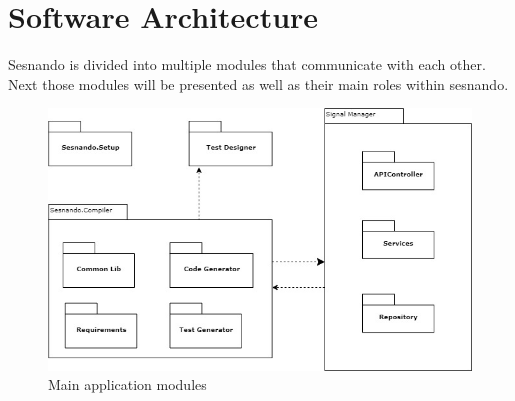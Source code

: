 \section{Software Architecture}
\label{sec:software_architecture}

Sesnando is divided into multiple modules that communicate with each other. Next those modules will be presented as well as their main roles within sesnando. \\

\begin{figure}[h]
    \centering
    \includegraphics[scale=0.625]{images/sesnando_modules.jpg}
    \caption{Main application modules}
\end{figure}
\label{fig:sesnando_modules}

